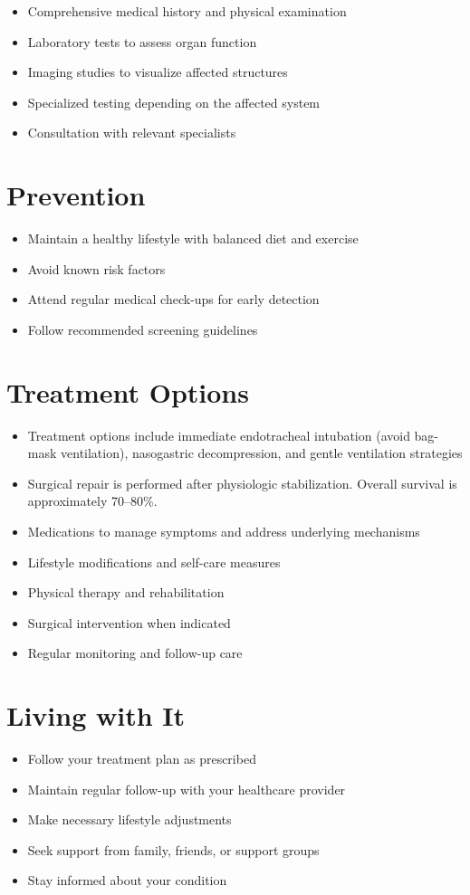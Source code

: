 \begin{itemize}[noitemsep]
  \item Comprehensive medical history and physical examination
  \item Laboratory tests to assess organ function
  \item Imaging studies to visualize affected structures
  \item Specialized testing depending on the affected system
  \item Consultation with relevant specialists
\end{itemize}
\section{Prevention}
\begin{itemize}[noitemsep]
  \item Maintain a healthy lifestyle with balanced diet and exercise
  \item Avoid known risk factors
  \item Attend regular medical check-ups for early detection
  \item Follow recommended screening guidelines
\end{itemize}
\section{Treatment Options}
\begin{itemize}[noitemsep]
  \item Treatment options include immediate endotracheal intubation (avoid bag-mask ventilation), nasogastric decompression, and gentle ventilation strategies
  \item Surgical repair is performed after physiologic stabilization. Overall survival is approximately 70--80\%.
  \item Medications to manage symptoms and address underlying mechanisms
  \item Lifestyle modifications and self-care measures
  \item Physical therapy and rehabilitation
  \item Surgical intervention when indicated
  \item Regular monitoring and follow-up care
\end{itemize}
\section{Living with It}
\begin{itemize}[noitemsep]
  \item Follow your treatment plan as prescribed
  \item Maintain regular follow-up with your healthcare provider
  \item Make necessary lifestyle adjustments
  \item Seek support from family, friends, or support groups
  \item Stay informed about your condition
\end{itemize}
